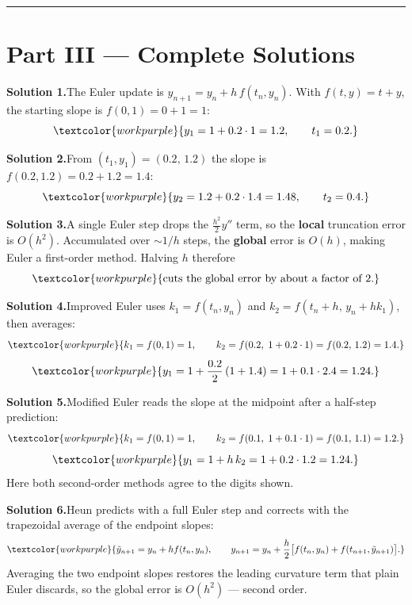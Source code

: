 \vspace{0.4em}
\hrule
\vspace{0.6em}

\clearpage
{}
{}
\section*{Part III --- Complete Solutions}

\noindent\textbf{Solution 1.}\quad The Euler update is
$y_{n+1} = y_n + h\,f(t_n,y_n)$. With $f(t,y)=t+y$, the starting slope is
$f(0,1) = 0 + 1 = 1$:
\[ \textcolor{workpurple}{y_1 = 1 + 0.2\cdot 1 = 1.2, \qquad t_1 = 0.2.} \]

\medskip
\noindent\textbf{Solution 2.}\quad From $(t_1,y_1) = (0.2,\,1.2)$ the slope is
$f(0.2,1.2) = 0.2 + 1.2 = 1.4$:
\[ \textcolor{workpurple}{y_2 = 1.2 + 0.2\cdot 1.4 = 1.48, \qquad t_2 = 0.4.} \]

\medskip
\noindent\textbf{Solution 3.}\quad A single Euler step drops the
$\tfrac{h^{2}}{2}y''$ term, so the \textbf{local} truncation error is $O(h^{2})$.
Accumulated over $\sim 1/h$ steps, the \textbf{global} error is $O(h)$, making
Euler a first-order method. Halving $h$ therefore
\[ \textcolor{workpurple}{\text{cuts the global error by about a factor of } 2.} \]

\medskip
\noindent\textbf{Solution 4.}\quad Improved Euler uses
$k_1 = f(t_n,y_n)$ and $k_2 = f(t_n+h,\,y_n+hk_1)$, then averages:
\[ \textcolor{workpurple}{k_1 = f(0,1) = 1, \qquad k_2 = f(0.2,\;1 + 0.2\cdot 1) = f(0.2,\,1.2) = 1.4.} \]
\[ \textcolor{workpurple}{y_1 = 1 + \frac{0.2}{2}\left(1 + 1.4\right) = 1 + 0.1\cdot 2.4 = 1.24.} \]

\medskip
\noindent\textbf{Solution 5.}\quad Modified Euler reads the slope at the
midpoint after a half-step prediction:
\[ \textcolor{workpurple}{k_1 = f(0,1) = 1, \qquad k_2 = f\!\left(0.1,\; 1 + 0.1\cdot 1\right) = f(0.1,\,1.1) = 1.2.} \]
\[ \textcolor{workpurple}{y_1 = 1 + h\,k_2 = 1 + 0.2\cdot 1.2 = 1.24.} \]
Here both second-order methods agree to the digits shown.

\medskip
\noindent\textbf{Solution 6.}\quad Heun predicts with a full Euler step and
corrects with the trapezoidal average of the endpoint slopes:
\[ \textcolor{workpurple}{\tilde{y}_{n+1} = y_n + h f(t_n,y_n), \qquad
   y_{n+1} = y_n + \frac{h}{2}\big[f(t_n,y_n) + f(t_{n+1},\tilde{y}_{n+1})\big].} \]
Averaging the two endpoint slopes restores the leading curvature term that plain
Euler discards, so the global error is $O(h^{2})$ --- second order.

